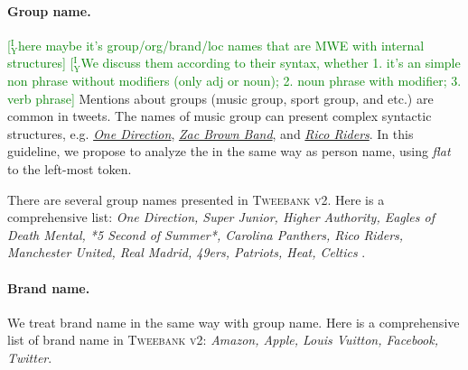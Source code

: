 \documentclass[11pt,a4paper]{article}
\newcommand{\yicomment}[1]{\textcolor{green}{[$_\mathrm{Y}^\mathrm{I}$#1]}}
\begin{document}
\paragraph{Group name.}\yicomment{here maybe it's group/org/brand/loc names that are MWE with internal structures}
\yicomment{We discuss them according to their syntax, whether 1. it's an simple non phrase without modifiers (only adj or noun); 2. noun phrase with modifier; 3. verb phrase}
Mentions about groups (music group, sport group, and etc.) are common in tweets.
The names of music group can present complex syntactic structures,
e.g. \underline{\textit{One Direction}}, \underline{\textit{Zac Brown Band}},
and \underline{\textit{Rico Riders}}.
In this guideline, we propose to analyze the in the same way as
person name, using \textit{flat} to the left-most token.

There are several group names presented in \textsc{Tweebank v2}. Here is a comprehensive list:
\textit{One Direction, Super Junior, 
	Higher Authority,
	Eagles of Death Mental, 
	*5 Second of Summer*,
	Carolina Panthers, Rico Riders, Manchester United, Real Madrid,
	49ers, Patriots, Heat, Celtics
}.

\paragraph{Brand name.}
We treat brand name in the same way with group name.
Here is a comprehensive list of brand name in \textsc{Tweebank v2}:
\textit{Amazon, Apple, Louis Vuitton, Facebook, Twitter}.
\end{document}
